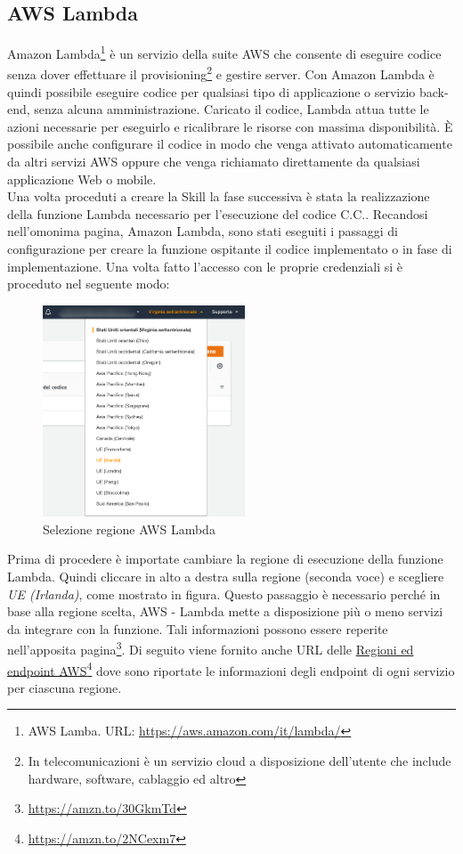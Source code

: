 \subsection{AWS Lambda}
Amazon Lambda\footnote{AWS Lamba. URL: \href{https://aws.amazon.com/it/lambda/}{https://aws.amazon.com/it/lambda/}} è un servizio della suite AWS che consente di eseguire codice senza dover effettuare il provisioning\footnote{In telecomunicazioni è un servizio cloud a disposizione dell'utente che include hardware, software, cablaggio ed altro} e gestire server. Con Amazon Lambda è quindi possibile eseguire codice per qualsiasi tipo di applicazione o servizio back-end, senza alcuna amministrazione. Caricato il codice, Lambda attua tutte le azioni necessarie per eseguirlo e ricalibrare le risorse con massima disponibilità. È possibile anche configurare il codice in modo che venga attivato automaticamente da altri servizi AWS oppure che venga richiamato direttamente da qualsiasi applicazione Web o mobile.\\[0.5cm]
Una volta proceduti a creare la Skill la fase successiva è stata la realizzazione della funzione Lambda necessario per l'esecuzione del codice C.C.. Recandosi nell'omonima pagina, Amazon Lambda, sono stati eseguiti i passaggi di configurazione per creare la funzione ospitante il codice implementato o in fase di implementazione. Una volta fatto l'accesso con le proprie credenziali si è proceduto nel seguente modo:
\begin{minipage}{0.5\textwidth}
	\begin{figure}[H]
		\includegraphics[width=6cm]{immagini/aws-lambda.png}
		\caption{\label{fig:aws_lambda_regione}Selezione regione AWS Lambda}
	\end{figure}
\end{minipage}
\begin{minipage}{0.5\textwidth}
	Prima di procedere è importate cambiare la regione di esecuzione della funzione Lambda. Quindi cliccare in alto a destra sulla regione (seconda voce) e scegliere \textit{UE (Irlanda)}, come mostrato in figura. Questo passaggio è necessario perché in base alla regione scelta, AWS - Lambda mette a disposizione più o meno servizi da integrare con la funzione. Tali informazioni possono essere reperite nell'apposita pagina\footnote{\href{https://amzn.to/30GkmTd}{https://amzn.to/30GkmTd}}. Di seguito viene fornito anche URL delle \href{https://amzn.to/2NCexm7}{Regioni ed endpoint AWS}\footnote{\href{https://amzn.to/2NCexm7}{https://amzn.to/2NCexm7}} dove sono riportate le informazioni degli endpoint di ogni servizio per ciascuna regione.
\end{minipage}
